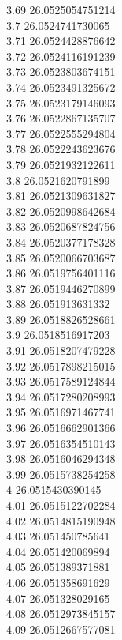 {3.69	26.0525054751214\\
3.7	26.0524741730065\\
3.71	26.0524428876642\\
3.72	26.0524116191239\\
3.73	26.0523803674151\\
3.74	26.0523491325672\\
3.75	26.0523179146093\\
3.76	26.0522867135707\\
3.77	26.0522555294804\\
3.78	26.0522243623676\\
3.79	26.0521932122611\\
3.8	26.0521620791899\\
3.81	26.0521309631827\\
3.82	26.0520998642684\\
3.83	26.0520687824756\\
3.84	26.0520377178328\\
3.85	26.0520066703687\\
3.86	26.0519756401116\\
3.87	26.0519446270899\\
3.88	26.051913631332\\
3.89	26.0518826528661\\
3.9	26.0518516917203\\
3.91	26.0518207479228\\
3.92	26.0517898215015\\
3.93	26.0517589124844\\
3.94	26.0517280208993\\
3.95	26.0516971467741\\
3.96	26.0516662901366\\
3.97	26.0516354510143\\
3.98	26.0516046294348\\
3.99	26.0515738254258\\
4	26.0515430390145\\
4.01	26.0515122702284\\
4.02	26.0514815190948\\
4.03	26.051450785641\\
4.04	26.051420069894\\
4.05	26.051389371881\\
4.06	26.051358691629\\
4.07	26.051328029165\\
4.08	26.0512973845157\\
4.09	26.0512667577081\\
}
